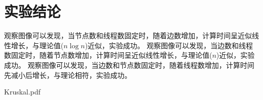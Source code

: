 \documentclass[UTF8]{ctexart}
\begin{document}
\section{实验结论}
观察图像可以发现，当节点数和线程数固定时，随着边数增加，计算时间呈近似线性增长，与理论值($n\log n$)近似，实验成功。
观察图像可以发现，当边数和线程数固定时，随着节点数增加，计算时间呈近似线性增长，与理论值($n$)近似，实验成功。
观察图像可以发现，当边数和节点数固定时，随着线程数增加，计算时间先减小后增长，与理论相符，实验成功。

\clearpage
\begin{thebibliography}{99}
    Kruskal.pdf
\end{thebibliography}
\end{document}
